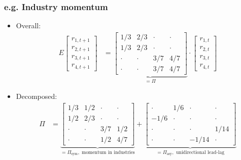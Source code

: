 \documentclass[10pt]{beamer}
\begin{document}
\begin{frame}[label=industry_example]
\frametitle{e.g. Industry momentum}
\begin{itemize}
\item Overall:
\begin{align*}
E\begin{bmatrix} r_{1,t+1} \\ r_{2,t+1} \\ r_{3,t+1} \\ r_{4,t+1} \end{bmatrix} & = \underbrace{\begin{bmatrix} 1/3 & 2/3 & \cdot & \cdot \\
1/3 & 2/3 & \cdot & \cdot \\ 
\cdot & \cdot & 3/7& 4/7 \\
\cdot & \cdot & 3/7& 4/7
\end{bmatrix}}_{=\Pi} \cdot \begin{bmatrix} r_{1,t} \\ r_{2,t} \\ r_{3,t} \\ r_{4,t} \end{bmatrix}
\end{align*}

\item Decomposed:
\begin{align*}
\Pi & = \underbrace{\begin{bmatrix} 1/3 & 1/2 & \cdot & \cdot \\
1/2 & 2/3 & \cdot & \cdot \\ 
\cdot & \cdot & 3/7 & 1/2 \\
\cdot & \cdot & 1/2 & 4/7
\end{bmatrix}}_{=\Pi_\text{sym}, \text{ momentum in industries}} + \underbrace{\begin{bmatrix} \cdot & 1/6 & \cdot & \cdot \\
-1/6 & \cdot & \cdot & \cdot \\ 
\cdot & \cdot & \cdot & 1/14 \\
\cdot & \cdot & -1/14 & \cdot
\end{bmatrix}}_{=\Pi_\text{asy}, \text{ unidirectional lead-lag}}
\end{align*}
\end{itemize}
~\hfill 
\hyperlink{industry_sym_pca}{}


\vspace{30pt}
\end{frame}
\end{document}
